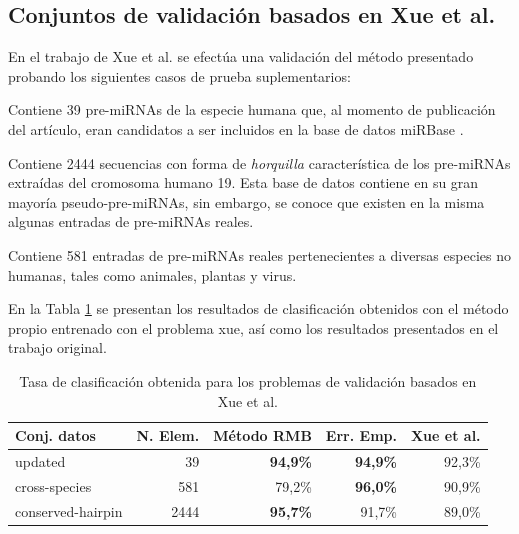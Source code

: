 \documentclass[12pt,bibliography=oldstyle,DIV=12,parskip=half-]{scrreprt}
\begin{document}
\subsection{Conjuntos de validación basados en Xue et al.}
%
En el trabajo de Xue et al. \cite{xue} se efectúa una validación del
método presentado probando los siguientes casos de prueba
suplementarios:
\begin{description}
  [style=sameline,leftmargin=10em,itemsep=6pt,align=right]
\item[updated] Contiene 39 pre-miRNAs de la especie humana que, al
  momento de publicación del artículo, eran candidatos a ser incluidos
  en la base de datos miRBase \cite{mirbase3}.
\item[conserved-hairpin] Contiene 2444 secuencias con forma de
  \emph{horquilla} característica de los pre-miRNAs extraídas del
  cromosoma humano 19. Esta base de datos contiene en su gran mayoría
  pseudo-pre-miRNAs, sin embargo, se conoce que existen en la misma
  algunas entradas de pre-miRNAs reales.
\item[cross-species] Contiene 581 entradas de pre-miRNAs reales
  pertenecientes a diversas especies no humanas, tales como animales,
  plantas y virus.
\end{description}
En la Tabla \ref{xue} se presentan los resultados de clasificación obtenidos
con el método propio entrenado con el problema xue,
así como los resultados presentados en el trabajo original.
%
\begin{table}[h]
  \small\center\sffamily
  \newcommand{\s}{\textbf}
  \begin{tabular}{lrrrr}\toprule
    Conj. datos & N. Elem. & Método RMB & Err. Emp. & Xue et al. \\\midrule
    updated           & 39 &   \s{94,9\%} & \s{94,9\%} & 92,3\% \\ 
    cross-species     & 581 &  79,2\% & \s{96,0\%} & 90,9\% \\
    conserved-hairpin & 2444 & \s{95,7\%} & 91,7\% & 89,0\% \\\bottomrule
  \end{tabular}
  \caption{\small Tasa de clasificación obtenida para los problemas de validación
    basados en Xue et al. \cite{xue}}
  \label{xue}
\end{table}
%
%
\end{document}
